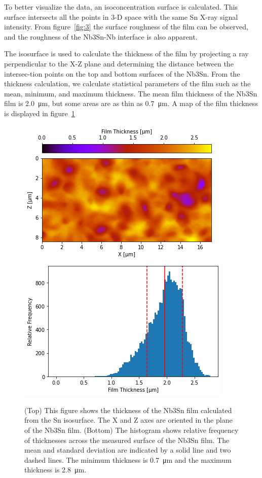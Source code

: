 To better visualize the data, an isoconcentration surface is calculated. This surface intersects all the points in 3-D space with the same Sn X-ray signal intensity. From figure~\ref{fig:3} the surface roughness of the film can be observed, and the roughness of the Nb3Sn-Nb interface is also apparent.
 
The isosurface is used to calculate the thickness of the film by projecting a ray perpendicular to the X-Z plane and determining the distance between the intersec-tion points on the top and bottom surfaces of the Nb3Sn. From the thickness calculation, we calculate statistical parameters of the film such as the mean, minimum, and maximum thickness. The mean film thickness of the Nb3Sn film is \qty{2.0}{\micro\meter}, but some areas are as thin as \qty{0.7}{\micro\meter}. A map of the film thickness is displayed in figure~\ref{fig:4}

\begin{figure}[htb]%
    \centering%
    \includegraphics[width=0.5\columnwidth]{../figs/Figure-4a.png}%
    \includegraphics[width=0.5\columnwidth]{../figs/Figure-4b.png}%
    \caption{(Top) This figure shows the thickness of the Nb3Sn film calculated from the Sn isosurface.  The X and Z axes are oriented in the plane of the Nb3Sn film. (Bottom) The histogram shows relative frequency of thicknesses across the measured surface of the Nb3Sn film. The mean and standard deviation are indicated by a solid line and two dashed lines. The minimum thickness is \qty{0.7}{\micro\meter} and the maximum thickness is \qty{2.8}{\micro\meter}.}%
    \label{fig:4}%
\end{figure}
 
